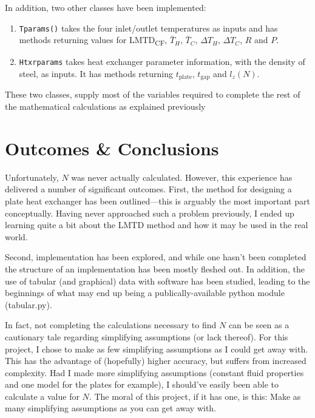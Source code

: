 \documentclass[12pt,letterpaper]{article}
\begin{document}
In addition, two other classes have been implemented:

\begin{enumerate}
\item \texttt{Tparams()} takes the four inlet/outlet temperatures as inputs and has methods returning values for LMTD\textsubscript{CF}, \(\bar{T}_H\), \(\bar{T}_C\), \(\Delta T_H\), \(\Delta T_C\), \(R\) and \(P\).
\item \texttt{Htxrparams} takes heat exchanger parameter information, with the density of steel, as inputs. It has methods returning \(t_{\textrm{plate}}\), \(t_{\textrm{gap}}\) and \(l_z(N)\).
\end{enumerate}

These two classes, supply most of the variables required to complete the rest of the mathematical calculations as explained previously

\section{Outcomes \& Conclusions}

Unfortunately, \(N\) was never actually calculated. However, this experience has delivered a number of significant outcomes. First, the method for designing a plate heat exchanger has been outlined---this is arguably the most important part conceptually. Having never approached such a problem previously, I ended up learning quite a bit about the LMTD method and how it may be used in the real world.

Second, implementation has been explored, and while one hasn't been completed the structure of an implementation has been mostly fleshed out. In addition, the use of tabular (and graphical) data with software has been studied, leading to the beginnings of what may end up being a publically-available python module (tabular.py).

In fact, not completing the calculations necessary to find \(N\) can be seen as a cautionary tale regarding simplifying assumptions (or lack thereof). For this project, I chose to make as few simplifying assumptions as I could get away with. This has the advantage of (hopefully) higher accuracy, but suffers from increased complexity. Had I made more simplifying assumptions (constant fluid properties and one model for the plates for example), I should've easily been able to calculate a value for \(N\). The moral of this project, if it has one, is this:  Make as many simplifying assumptions as you can get away with.
\end{document}
